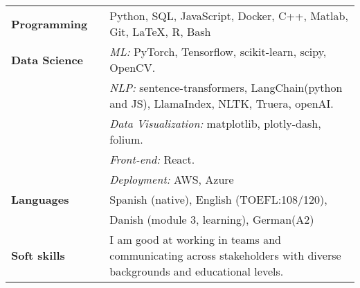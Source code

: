 \documentclass[a4paper, 12pt]{article}
\begin{document}
\begin{tabular}{p{7em} p{1em} p{32.5em}}
\textbf{Programming} & &  Python, SQL, JavaScript, Docker, C++, Matlab, Git, \LaTeX, R,  Bash \\
\textbf{Data Science} & & \textit{ML:} PyTorch, Tensorflow, scikit-learn, scipy, OpenCV. \\
& & \textit{NLP:} sentence-transformers, LangChain(python and JS), LlamaIndex, NLTK, Truera, openAI. \\
& & \textit{Data Visualization:} matplotlib, plotly-dash, folium. \\
& & \textit{Front-end:} React. \\
& & \textit{Deployment:} AWS, Azure \\
\textbf{Languages} & & Spanish (native), English (TOEFL:108/120), \\
& & Danish (module 3, learning), German(A2) \\
\textbf{Soft skills} & & I am good at working in teams and communicating across stakeholders with diverse backgrounds and educational levels.  \\
\end{tabular}
\end{document}
